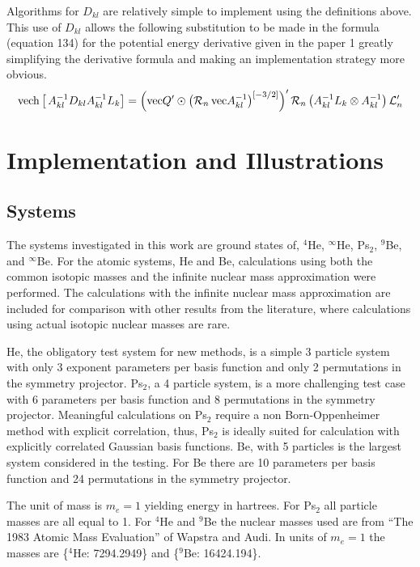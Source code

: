 \documentclass[12pt,thmsa]{article}
\begin{document}
Algorithms for $D_{kl}$ are relatively simple to implement using the
definitions above. This use of $D_{kl}$ allows the following substitution to
be made in the formula (equation 134) for the potential energy derivative
given in the paper 1 greatly simplifying the derivative formula and making
an implementation strategy more obvious. 
\begin{equation}
\mathrm{vech}\left[ \,A_{kl}^{-1}D_{kl}A_{kl}^{-1}L_k\right] =\left( \mathrm{%
vec}Q^{\prime }\odot \left( \mathcal{R}_n\,\mathrm{vec}A_{kl}^{-1}\right)
^{\left[ -3/2\right] }\right) ^{\prime }\mathcal{R}_n\left(
A_{kl}^{-1}L_k\otimes A_{kl}^{-1}\right) \mathcal{L}_n^{\prime }
\end{equation}

\section{Implementation and Illustrations}

\subsection{Systems}

The systems investigated in this work are ground states of, $^4$He, $^\infty 
$He, Ps$_2$, $^9$Be, and $^\infty $Be. For the atomic systems, He and Be,
calculations using both the common isotopic masses and the infinite nuclear
mass approximation were performed. The calculations with the infinite
nuclear mass approximation are included for comparison with other results
from the literature, where calculations using actual isotopic nuclear masses
are rare.

He, the obligatory test system for new methods, is a simple 3 particle
system with only 3 exponent parameters per basis function and only 2
permutations in the symmetry projector. Ps$_2$, a 4 particle system, is a
more challenging test case with 6 parameters per basis function and 8
permutations in the symmetry projector. Meaningful calculations on Ps$_2$
require a non Born-Oppenheimer method with explicit correlation, thus, Ps$_2$
is ideally suited for calculation with explicitly correlated Gaussian basis
functions. Be, with 5 particles is the largest system considered in the
testing. For Be there are 10 parameters per basis function and 24
permutations in the symmetry projector.

The unit of mass is $m_e=1$ yielding energy in hartrees. For Ps$_2$ all
particle masses are all equal to 1. For $^4$He and $^9$Be the nuclear masses
used are from ``The 1983 Atomic Mass Evaluation'' of Wapstra and Audi\cite
{Wapstra}. In units of $m_e=1$ the masses are \{$^4$He: 7294.2949\} and \{$%
^9 $Be: 16424.194\}.
\end{document}

